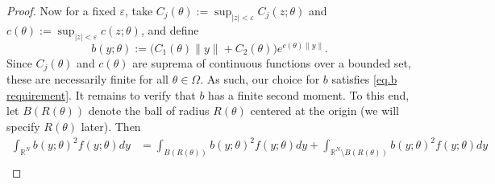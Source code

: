 \documentclass[times,10pt]{elsarticle}
\theoremstyle{plain}
\begin{document}
\begin{proof}
Now for a fixed $\varepsilon$, take $C_j(\theta):=\sup_{|z|<\varepsilon}C_j(z;\theta)$ and $c(\theta):=\sup_{|z|<\varepsilon}c(z;\theta)$, and define 
\begin{equation*}
b(y;\theta):=\Big(C_1(\theta)\|y\|+C_2(\theta)\Big)e^{c(\theta)\|y\|}.
\end{equation*}
Since $C_j(\theta)$ and $c(\theta)$ are suprema of continuous functions over a bounded set, these are necessarily finite for all $\theta\in\Omega$.
As such, our choice for $b$ satisfies \eqref{eq.b requirement}.
It remains to verify that $b$ has a finite second moment.
To this end, let $B(R(\theta))$ denote the ball of radius $R(\theta)$ centered at the origin (we will specify $R(\theta)$ later).
Then
\begin{align}
\nonumber
\int_{\mathbb{R}^N}b(y;\theta)^2f(y;\theta)dy
&=\int_{B(R(\theta))}b(y;\theta)^2f(y;\theta)dy+\int_{\mathbb{R}^N\setminus B(R(\theta))}b(y;\theta)^2f(y;\theta)dy\\

\end{align}
\end{proof}
\end{document}
